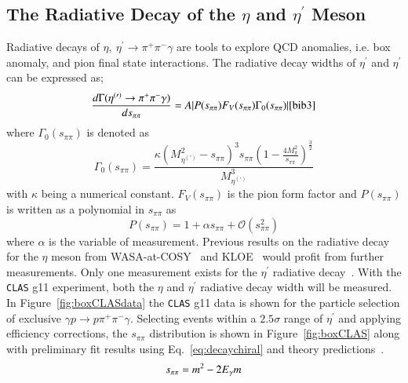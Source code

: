 \documentclass[epj]{webofc}
\begin{document}
\subsection{The Radiative Decay of the $\eta$ and $\eta^\prime$  Meson}
Radiative decays of  $\eta , \ \eta^{\prime} \to \pi^+ \pi^- \gamma $ are tools to explore QCD anomalies, i.e. box anomaly, and pion final state interactions. The radiative decay widths of $ \eta^{\prime}$ and $\eta^{\prime}$ can be expressed as; 
\begin{equation}
\frac{d\Gamma (\eta^{(\prime)} \to \pi^+ \pi^- \gamma)}{ds_{\pi\pi}} = A\vert P(s_{\pi\pi}) F_V(s_{\pi\pi}) \Gamma_0(s_{\pi\pi})\vert  \label{eq:decaywidth} \cite{bib3} \\
\end{equation}
where $\Gamma_0(s_{\pi\pi})$ is denoted as
\begin{equation}
\Gamma_0(s_{\pi\pi}) = \frac{\kappa \left(M^2_{\eta^{(\prime)}} - s_{\pi\pi} \right)^3  s_{\pi\pi} \left(1- \frac{ 4M^2_{\pi }}{    s_{\pi\pi}  }\right)^{\frac{3}{2}}   }{M^3_{\eta^{(\prime)} }}  \label{eq:decayconstant} 
\end{equation}
with $\kappa$ being a numerical constant. $F_V(s_{\pi\pi})$ is the pion form factor and  
$P(s_{\pi\pi})$ is written as a polynomial in $s_{\pi\pi}$ as
\begin{equation}
P(s_{\pi\pi}) = 1 + \alpha s_{\pi\pi} + \mathcal{O}(s_{\pi\pi}^2) \label{eq:decaychiral}
\end{equation}
where $\alpha$ is the variable of measurement.
Previous results on the radiative decay for the $\eta$ meson from WASA-at-COSY~\cite{bib0} and KLOE~\cite{bib1} would profit from further measurements. Only one measurement exists for the $\eta^{\prime}$ radiative decay~\cite{bib2}. With the \textsc{\texttt{CLAS}} g11 experiment, both the $\eta$ and  $\eta^{\prime}$ radiative decay width will be measured. In Figure~\ref{fig:boxCLASdata} the \textsc{\texttt{CLAS}} g11 data is shown for the particle selection of exclusive $\gamma p \to p  \pi^+ \pi^- \gamma $. Selecting events within a $2.5 \sigma$ range of $\eta^{\prime}$ and applying efficiency corrections, the $s_{\pi\pi}$ distribution is shown in Figure~\ref{fig:boxCLAS} along with preliminary fit results using Eq.~\ref{eq:decaychiral} and theory predictions~\cite{Kubis2015}.  
\begin{equation}
s_{\pi\pi} = m^2 - 2E_{\gamma}m \label{eq:spipi} \\
\end{equation}
\end{document}
